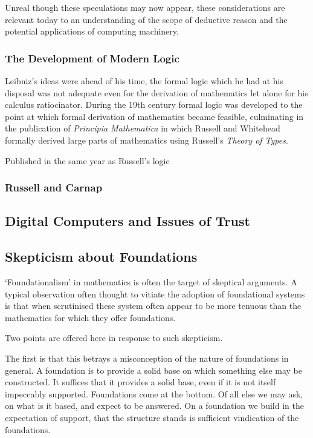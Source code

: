 \documentclass{rbjk}
\begin{document}
\begin{article}
{Unreal though these speculations may now appear, these considerations are relevant today to an understanding of the scope of deductive reason and the potential applications of computing machinery.

\subsubsection{The Development of Modern Logic}

Leibniz's ideas were ahead of his time, the formal logic which he had at his disposal was not adequate even for the derivation of mathematics let alone for his calculus ratiocinator.
During the 19th century formal logic was developed to the point at which formal derivation of mathematics became feasible, culminating in the publication of {\it Principia Mathematica} in which Russell and Whitehead formally derived large parts of mathematics using Russell's {\it Theory of Types}.

Published in the same year as Russell's logic \cite{Russell08}

\subsubsection{Russell and Carnap}

\subsection{Digital Computers and Issues of Trust}

\subsection{Skepticism about Foundations}

`Foundationalism' in mathematics is often the target of skeptical arguments.
A typical observation often thought to vitiate the adoption of foundational systems is that when scrutinised these system often appear to be more tenuous than the mathematics for which they offer foundations.

Two points are offered here in response to such skepticism.

The first is that this betrays a misconception of the nature of foundations in general.
A foundation is to provide a solid base on which something else may be constructed.
It suffices that it provides a solid base, even if it is not itself impeccably supported.
Foundations come at the bottom.
Of all else we may ask, on what is it based, and expect to be answered.
On a foundation we build in the expectation of support, that the structure stands is sufficient vindication of the foundations.

}
\end{article}
\end{document}
